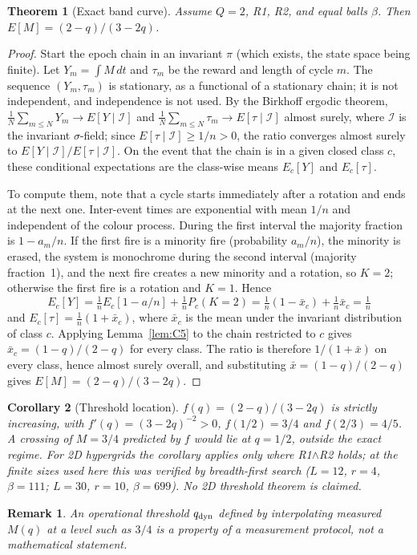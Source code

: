 \documentclass[pdflatex,sn-mathphys-num]{sn-jnl}
\theoremstyle{thmstyleone}%
\newtheorem{theorem}{Theorem}[section]
\newtheorem{corollary}[theorem]{Corollary}
\theoremstyle{thmstylethree}%
\theoremstyle{thmstyletwo}%
\newtheorem{remark}{Remark}[theorem]
\begin{document}
\begin{theorem}[Exact band curve]
\label{thm:C6}
Assume $Q=2$, R1, R2, and equal balls $\beta$. Then
$E[M]=(2-q)/(3-2q)$.
\end{theorem}
\begin{proof}
Start the epoch chain in an invariant $\pi$ (which exists, the state space
being finite). Let $Y_m=\int M\,dt$ and $\tau_m$ be the reward and length
of cycle $m$. The sequence $(Y_m,\tau_m)$ is stationary, as a functional
of a stationary chain; it is not independent, and independence is not
used. By the Birkhoff ergodic theorem,
$\frac1N\sum_{m\le N}Y_m\to E[Y\mid\mathcal I]$ and
$\frac1N\sum_{m\le N}\tau_m\to E[\tau\mid\mathcal I]$ almost surely, where
$\mathcal I$ is the invariant $\sigma$-field; since
$E[\tau\mid\mathcal I]\ge1/n>0$, the ratio converges almost surely to
$E[Y\mid\mathcal I]/E[\tau\mid\mathcal I]$. On the event that the chain is
in a given closed class $c$, these conditional expectations are the
class-wise means $E_c[Y]$ and $E_c[\tau]$.

To compute them, note that a cycle starts immediately after a rotation
and ends at the next one. Inter-event times are exponential with mean
$1/n$ and independent of the colour process. During the first interval
the majority fraction is $1-a_m/n$. If the first fire is a minority fire
(probability $a_m/n$), the minority is erased, the system is monochrome
during the second interval (majority fraction~1), and the next fire
creates a new minority and a rotation, so $K=2$; otherwise the first fire
is a rotation and $K=1$. Hence
\[
E_c[Y]=\tfrac1n E_c[1-a/n]+\tfrac1n P_c(K=2)
=\tfrac1n(1-\bar x_c)+\tfrac1n\bar x_c=\tfrac1n
\]
and $E_c[\tau]=\frac1n(1+\bar x_c)$, where $\bar x_c$ is the
mean under the invariant distribution of class $c$. Applying
Lemma~\ref{lem:C5} to the chain restricted to $c$ gives
$\bar x_c=(1-q)/(2-q)$ for every class. The ratio is therefore
$1/(1+\bar x)$ on every class, hence almost surely overall, and
substituting $\bar x=(1-q)/(2-q)$ gives $E[M]=(2-q)/(3-2q)$.
\end{proof}

\begin{corollary}[Threshold location]
\label{cor:C7}
$f(q)=(2-q)/(3-2q)$ is strictly increasing, with $f'(q)=(3-2q)^{-2}>0$,
$f(1/2)=3/4$ and $f(2/3)=4/5$. A crossing of $M=3/4$ predicted by $f$
would lie at $q=1/2$, outside the exact regime. For 2D hypergrids the
corollary applies only where R1$\wedge$R2 holds; at the finite sizes used
here this was verified by breadth-first search ($L=12$, $r=4$,
$\beta=111$; $L=30$, $r=10$, $\beta=699$). No 2D threshold theorem is
claimed.
\end{corollary}
\begin{remark}
\label{rem:C7.1}
An operational threshold $q_{\rm dyn}$ defined by interpolating measured
$M(q)$ at a level such as $3/4$ is a property of a measurement protocol,
not a mathematical statement.
\end{remark}
\end{document}
